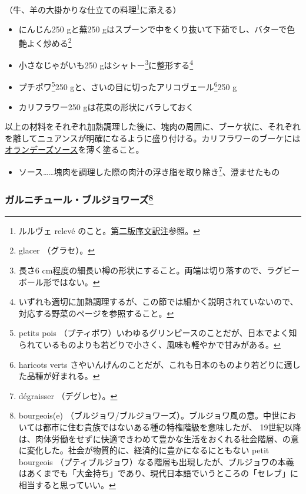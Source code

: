 \begin{recette}

（牛、羊の大掛かりな仕立ての料理\footnote{ルルヴェ relevé
  のこと。\protect\hyperlink{releve}{第二版序文訳注}参照。}に添える）

\begin{itemize}
\item
  にんじん250 gと蕪250
  gはスプーンで中をくり抜いて下茹でし、バターで色艶よく炒める\footnote{glacer
    （グラセ）。}
\item
  小さなじゃがいも250 gはシャトー\footnote{長さ6
    cm程度の細長い樽の形状にすること。両端は切り落すので、ラグビーボール形ではない。}に整形する\footnote{いずれも適切に加熱調理するが、この節では細かく説明されていないので、対応する野菜のページを参照すること。}
\item
  プチポワ\footnote{petits pois
    （プティポワ）いわゆるグリンピースのことだが、日本でよく知られているものよりも若どりで小さく、風味も軽やかで甘みがある。}250
  gと、さいの目に切ったアリコヴェール\footnote{haricots verts
    さやいんげんのことだが、これも日本のものより若どりに適した品種が好まれる。}250
  g
\item
  カリフラワー250 gは花束の形状にバラしておく
\end{itemize}

以上の材料をそれぞれ加熱調理した後に、塊肉の周囲に、ブーケ状に、それぞれを離してニュアンスが明確になるように盛り付ける。カリフラワーのブーケには\protect\hyperlink{sauce-hollandaise}{オランデーズソース}を薄く塗ること。

\begin{itemize}
\tightlist
\item
  ソース\ldots{}\ldots{}塊肉を調理した際の肉汁の浮き脂を取り除き\footnote{dégraisser
    （デグレセ）。}、澄ませたもの
\end{itemize}

\hypertarget{garniture-bourgeoise}{%
\subsubsection[ガルニチュール・ブルジョワーズ]{\texorpdfstring{ガルニチュール・ブルジョワーズ\footnote{bourgeois(e)
  （ブルジョワ/ブルジョワーズ）。ブルジョワ風の意。中世においては都市に住む貴族ではないある種の特権階級を意味したが、
  19世紀以降は、肉体労働をせずに快適できわめて豊かな生活をおくれる社会階層、の意に変化した。社会が物質的に、経済的に豊かになるにともない
  petit bourgeois
  （プティブルジョワ）なる階層も出現したが、ブルジョワの本義はあくまでも「大金持ち」であり、現代日本語でいうところの「セレブ」に相当すると思っていい。}}{ガルニチュール・ブルジョワーズ}}\label{garniture-bourgeoise}}


\end{recette}
